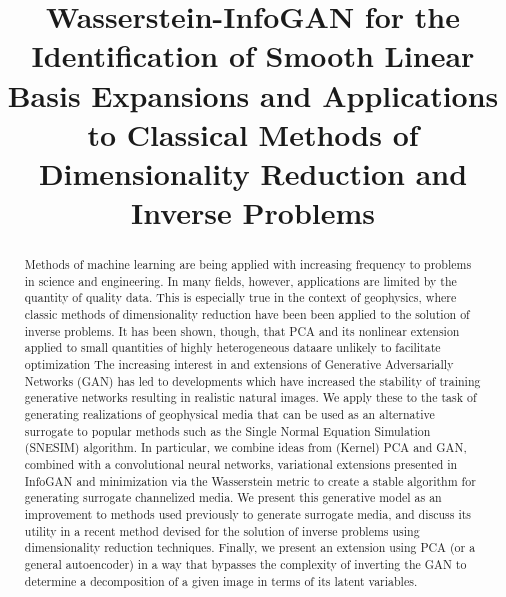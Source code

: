 \documentclass{article}
\title{Wasserstein-InfoGAN for the Identification of Smooth Linear Basis Expansions 
		and Applications to Classical Methods of Dimensionality Reduction and Inverse Problems  }
\begin{document}
\maketitle


\begin{abstract}
Methods of machine learning are being applied with increasing frequency to problems in science and engineering.  In many fields, however, applications are limited by the quantity of quality data.  This is especially true in the context of geophysics, where classic methods of dimensionality reduction have been been applied to the solution of inverse problems.  It has been shown, though, that PCA and its nonlinear extension applied to small quantities of highly heterogeneous dataare unlikely to facilitate optimization  The increasing interest in and extensions of Generative Adversarially Networks (GAN) has led to developments which have increased the stability of training generative networks resulting in realistic natural images.  We apply these to the task of generating realizations of geophysical media that can be used as an alternative surrogate to popular methods such as the Single Normal Equation Simulation (SNESIM) algorithm.  In particular, 	we combine ideas from (Kernel) PCA and GAN, combined with a convolutional neural networks, variational extensions presented in InfoGAN and minimization via the Wasserstein metric to create a stable algorithm for generating surrogate channelized media.  We present this generative model as an improvement to methods used previously to generate surrogate media, and discuss its utility in a recent method devised for the solution of inverse problems using dimensionality reduction techniques.  Finally, we present an extension using PCA (or a general autoencoder) in a way that bypasses the complexity of inverting the GAN to determine a decomposition of a given image in terms of its latent variables.




\end{abstract}
\end{document}
